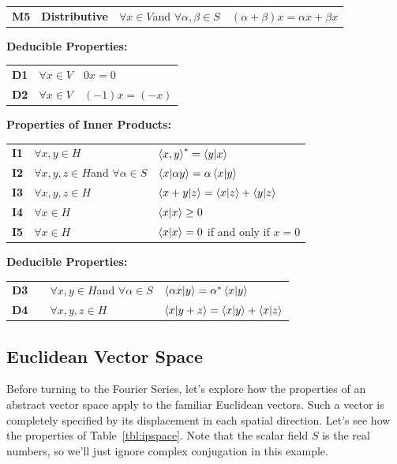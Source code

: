\documentclass[12pt]{book}
\begin{document}
\begin{table}
\begin{center}
\begin{tabular}{llll}
  {\bf M5} & {\bf Distributive} & $\forall x \in V$and $\forall \alpha,\beta \in S$ & $ (\alpha + \beta)x = \alpha x + \beta x $ \\
\end{tabular}
\vskip 0.5cm
{\bf Deducible Properties:}\\
\begin{tabular}{lll}
{\bf D1}  & $\forall x \in V $  & $0x = 0$ \\
{\bf D2}  & $\forall x \in V $  & $(-1)x = (-x)$ \\
\end{tabular}
\vskip 0.5cm
{\bf Properties of Inner Products:}\\
\begin{tabular}{lll}
  {\bf I1} & $\forall x,y \in H$ & $\braket{x,y}^* = \braket{y|x}$\\
{\bf I2} & $\forall x,y,z \in H$and $\forall \alpha \in S$ &
$\braket{x|\alpha y} = \alpha \braket{x|y}$\\
{\bf I3} & $\forall x,y,z \in H$ & $\braket{x+y|z} = \braket{x|z}+\braket{y|z}$\\
{\bf I4} & $\forall x \in H$ & $\braket{x|x} \geq 0$ \\
{\bf I5} & $\forall x \in H$ & $\braket{x|x}=0$ if and only if $x=0$ \\
\end{tabular}
\vskip 0.5cm
{\bf Deducible Properties:}\\
\begin{tabular}{llll}
{\bf D3} & & $\forall x,y \in H$and $\forall \alpha \in S$ &
$\braket{\alpha x|y} = \alpha^* \braket{x|y}$\\
{\bf D4} & & $\forall x,y,z \in H$ &
$\braket{x|y+z} = \braket{x|y}+\braket{x|z}$\\
\end{tabular}
\end{center}
\end{table}

\subsection{Euclidean Vector Space}

Before turning to the Fourier Series, let's explore how the properties of an abstract vector space apply to the familiar Euclidean vectors.  Such a vector is completely specified by its displacement in each spatial direction.  Let's see how the properties of Table~\ref{tbl:ipspace}.  Note that the scalar field $S$ is the real numbers, so we'll just ignore complex conjugation in this example.
\end{document}
